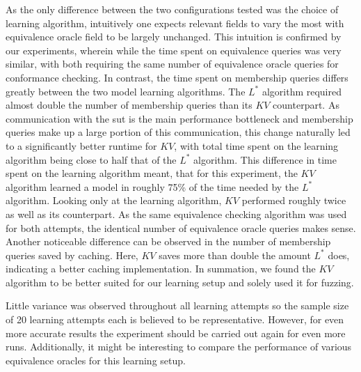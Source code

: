 As the only difference between the two configurations tested was the choice of learning algorithm, intuitively one expects relevant fields to vary the most with equivalence oracle field to be largely unchanged. This intuition is confirmed by our experiments, wherein while the time spent on equivalence queries was very similar, with both requiring the same number of equivalence oracle queries for conformance checking. In contrast, the time spent on membership queries differs greatly between the two model learning algorithms. The $L^*$ algorithm required almost double the number of membership queries than its $KV$ counterpart. As communication with the \ac{sut} is the main performance bottleneck and membership queries make up a large portion of this communication, this change naturally led to a significantly better runtime for $KV$, with total time spent on the learning algorithm being close to half that of the $L^*$ algorithm. This difference in time spent on the learning algorithm meant, that for this experiment, the $KV$ algorithm learned a model in roughly 75\% of the time needed by the $L^*$ algorithm. Looking only at the learning algorithm, $KV$ performed roughly twice as well as its counterpart. As the same equivalence checking algorithm was used for both attempts, the identical number of equivalence oracle queries makes sense. Another noticeable difference can be observed in the number of membership queries saved by caching. Here, $KV$ saves more than double the amount $L^*$ does, indicating a better caching implementation. In summation, we found the $KV$ algorithm to be better suited for our learning setup and solely used it for fuzzing. 

Little variance was observed throughout all learning attempts so the sample size of 20 learning attempts each is believed to be representative. However, for even more accurate results the experiment should be carried out again for even more runs. Additionally, it might be interesting to compare the performance of various equivalence oracles for this learning setup.


